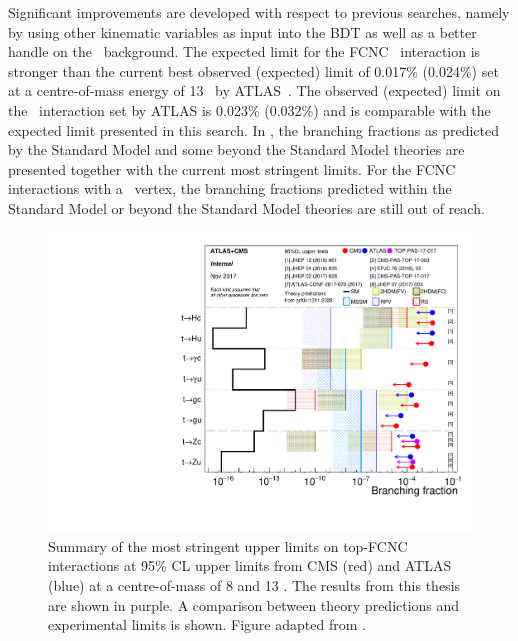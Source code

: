 Significant improvements are developed with respect to previous searches, namely by using other kinematic variables as input into the BDT as well as a better handle on the \NPL\ background.  The expected limit for the FCNC \Zut\ interaction is stronger than the current best observed (expected) limit of 0.017\% (0.024\%) set at a centre-of-mass energy of 13 \TeV\ by ATLAS~\cite{ATLAS-CONF-2017-070}.  The  observed (expected) limit on the \Zct\ interaction set by ATLAS is 0.023\% (0.032\%) and is comparable with the expected limit presented  in this search. In , the branching fractions as predicted by the Standard Model and some beyond the Standard Model theories are presented together with the current most stringent limits. For the FCNC interactions with a \tZq\ vertex, the branching fractions predicted within the Standard Model or beyond the Standard Model theories are still out of reach. 
\begin{figure}[htbp]
	\centering
	\includegraphics[width=0.7\linewidth]{7_Conclusion/Figures/fcnc_upperlimits.pdf}
	\caption{Summary of the most stringent upper limits on top-FCNC interactions at 95\% CL upper limits from CMS (red) and ATLAS (blue) at a centre-of-mass of 8 and 13 \TeV. The results from this thesis are shown in purple. A comparison between theory predictions and experimental limits is shown. Figure adapted from \cite{summarywiki}.}
	\label{fig:fcncupperlimitss}
\end{figure}


\clearpage
